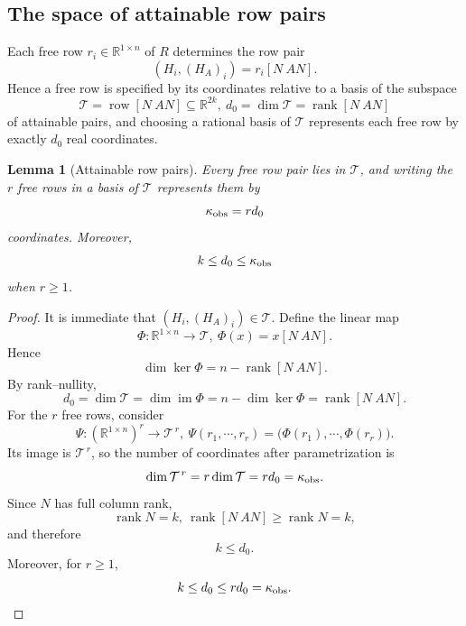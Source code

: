 \documentclass[journal]{IEEEtran}
\theoremstyle{plainn}
\newtheorem{lem}{Lemma}
\theoremstyle{remark}
\begin{document}
\subsection{The space of attainable row pairs}\label{sec:free}
Each free row $r_i\in\mathbb R^{1\times n}$ of $R$ determines the row pair
\begin{equation*}
	(H_i,(H_A)_i)=r_i[N\ AN].
\end{equation*}
Hence a free row is specified by its coordinates relative to a basis of the subspace
\begin{equation*}
\mathcal T=\operatorname{row}[N\ AN]\subseteq\mathbb R^{2k},\ 
d_0=\dim\mathcal T=\operatorname{rank}[N\ AN]
\end{equation*}
of attainable pairs, and choosing a rational basis of $\mathcal T$ represents each free
row by exactly $d_0$ real coordinates.
\begin{lem}[Attainable row pairs] Every free row pair lies in $\mathcal T$, and writing the $r$ free rows in a basis of $\mathcal T$ represents them by
\begin{equation}\label{eq:kappa}
\kappa_{\rm obs}=r d_0
\end{equation}
coordinates. Moreover,
\begin{equation*}
k\le d_0\le\kappa_{\rm obs}
\end{equation*}
when $r\ge1$.

\end{lem}
\begin{proof} It is immediate that $(H_i,(H_A)_i)\in\mathcal T$. Define the linear map
	\begin{equation*}
		\Phi:\mathbb R^{1\times n}\to\mathcal T,\ \Phi(x)=x[N\ AN].
	\end{equation*}
	Hence
	\begin{equation*}
		\dim\ker\Phi=n-\operatorname{rank}[N\ AN].
	\end{equation*}
	By rank--nullity,
	\begin{equation*}
		d_0
		=\dim\mathcal T
		=\dim\operatorname{im}\Phi
		=n-\dim\ker\Phi
		=\operatorname{rank}[N\ AN].
	\end{equation*}
	For the $r$ free rows, consider
	\begin{equation*}
		\Psi:(\mathbb R^{1\times n})^r\to\mathcal T^{\,r},\ 
		\Psi(r_1,\cdots,r_r)=\bigl(\Phi(r_1),\cdots,\Phi(r_r)\bigr).
	\end{equation*}
	Its image is $\mathcal T^{\,r}$, so the number of coordinates after parametrization is
	\begin{equation*}
		\dim\mathcal T^{\,r}=r\dim\mathcal T=rd_0=\kappa_{\rm obs}.
	\end{equation*}
	Since $N$ has full column rank,
	\begin{equation*}
		\operatorname{rank}N=k,\ 
		\operatorname{rank}[N\ AN]\ge \operatorname{rank}N=k,
	\end{equation*}
	and therefore
	\begin{equation}\label{lem3-1}
		k\le d_0.
	\end{equation}
	Moreover, for $r\ge1$,
	\begin{equation}\label{lem3-2}
		k\le d_0\le rd_0=\kappa_{\rm obs}.
	\end{equation}
\end{proof}
\end{document}
